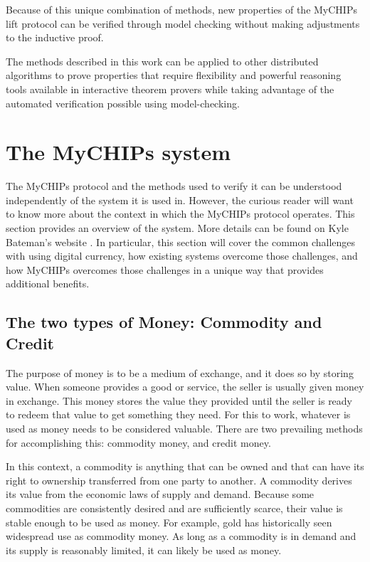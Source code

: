 \documentclass[runningheads]{llncs}
\begin{document}
Because of this unique combination of methods, new properties of the MyCHIPs lift protocol can be verified through model checking without making adjustments to the inductive proof.

The methods described in this work can be applied to other distributed algorithms to prove properties that require flexibility and powerful reasoning tools available in interactive theorem provers while taking advantage of the automated verification possible using model-checking.
\appendix

\section{The MyCHIPs system}
\label{apdx:mychips}
The MyCHIPs protocol and the methods used to verify it can be understood independently of the system it is used in. However, the curious reader will want to know more about the context in which the MyCHIPs protocol operates. This section provides an overview of the system. More details can be found on Kyle Bateman's website \cite{bateman_myCHIPs}. 
In particular, this section will cover the common challenges with using digital currency, how existing systems overcome those challenges, and how MyCHIPs overcomes those challenges in a unique way that provides additional benefits. 

\subsection{The two types of Money: Commodity and Credit}
The purpose of money is to be a medium of exchange, and it does so by storing value. When someone provides a good or service, the seller is usually given money in exchange. This money stores the value they provided until the seller is ready to redeem that value to get something they need.
For this to work, whatever is used as money needs to be considered valuable. There are two prevailing methods for accomplishing this: commodity money, and credit money. 

In this context, a commodity is anything that can be owned and that can have its right to ownership transferred from one party to another. A commodity derives its value from the economic laws of supply and demand. Because some commodities are consistently desired and are sufficiently scarce, their value is stable enough to be used as money. For example, gold has historically seen widespread use as commodity money. As long as a commodity is in demand and its supply is reasonably limited, it can likely be used as money.
\end{document}
